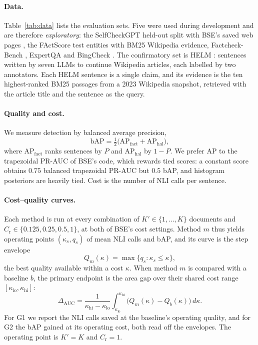 \documentclass[11pt]{article}
\newcommand{\Cr}{C_{\mathrm{r}}}
\begin{document}
\paragraph{Data.} Table~\ref{tab:data} lists the evaluation sets. Five were
used during development and are therefore \emph{exploratory}: the SelfCheckGPT
held-out split with BSE's saved web pages
\citep{manakul-etal-2023-selfcheckgpt}, the FActScore test entities with BM25
Wikipedia evidence, Factcheck-Bench \citep{wang-etal-2024-factcheck}, ExpertQA
\citep{malaviya-etal-2024-expertqa} and BingCheck \citep{li-etal-2024-self}.
The confirmatory set is HELM \citep{su-etal-2024-unsupervised}: sentences
written by seven LLMs to continue Wikipedia articles, each labelled by two
annotators. Each HELM sentence is a single claim, and its evidence is the ten
highest-ranked BM25 passages from a 2023 Wikipedia snapshot, retrieved with
the article title and the sentence as the query.

\paragraph{Quality and cost.} We measure detection by balanced average
precision,
\begin{equation}
\mathrm{bAP} = \tfrac12\bigl(\mathrm{AP}_{\mathrm{fact}} + \mathrm{AP}_{\mathrm{hal}}\bigr),
\label{eq:bap}
\end{equation}
where $\mathrm{AP}_{\mathrm{fact}}$ ranks sentences by $P$ and
$\mathrm{AP}_{\mathrm{hal}}$ by $1 - P$. We prefer AP to the trapezoidal
PR-AUC of BSE's code, which rewards tied scores: a constant score obtains
$0.75$ balanced trapezoidal PR-AUC but $0.5$ bAP, and histogram posteriors are
heavily tied. Cost is the number of NLI calls per sentence.

\paragraph{Cost--quality curves.} Each method is run at every combination of
$K' \in \{1, \dots, K\}$ documents and $\Cr \in \{0.125, 0.25, 0.5, 1\}$, at
both of BSE's cost settings. Method $m$ thus yields operating points
$(\kappa_s, q_s)$ of mean NLI calls and bAP, and its curve is the step
envelope
\begin{equation}
Q_m(\kappa) = \max\{q_s : \kappa_s \le \kappa\},
\label{eq:envelope}
\end{equation}
the best quality available within a cost $\kappa$. When method $m$ is
compared with a baseline $b$, the primary endpoint is the area gap over their
shared cost range $[\kappa_{\mathrm{lo}}, \kappa_{\mathrm{hi}}]$:
\begin{equation}
\Delta_{\mathrm{AUC}} = \frac{1}{\kappa_{\mathrm{hi}} - \kappa_{\mathrm{lo}}}
  \int_{\kappa_{\mathrm{lo}}}^{\kappa_{\mathrm{hi}}} \bigl(Q_m(\kappa) - Q_b(\kappa)\bigr)\, d\kappa.
\label{eq:auc}
\end{equation}
For G1 we report the NLI calls saved at the baseline's operating quality,
and for G2 the bAP gained at its operating cost, both read off the envelopes.
The operating point is $K' = K$ and $\Cr = 1$.
\end{document}
